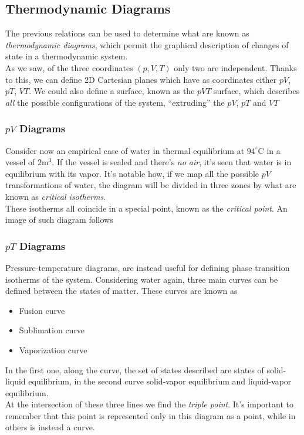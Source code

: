 \documentclass[../qm.tex]{subfiles}
\begin{document}
\subsection{Thermodynamic Diagrams}
The previous relations can be used to determine what are known as \textit{thermodynamic diagrams}, which permit the graphical description of changes of state in a thermodynamic system.\\
As we saw, of the three coordinates $(p, V, T)$ only two are independent. Thanks to this, we can define 2D Cartesian planes which have as coordinates either $pV$, $pT$, $VT$. We could also define a surface, known as the $pVT$ surface, which describes \textit{all} the possible configurations of the system, ``extruding'' the $pV$, $pT$ and $VT$
\subsubsection{$pV$ Diagrams}
Consider now an empirical case of water in thermal equilibrium at $94^\circ\mathrm{C}$ in a vessel of $2\mathrm{m}^3$. If the vessel is sealed and there's \textit{no air}, it's seen that water is in equilibrium with its vapor. It's notable how, if we map all the possible $pV$ transformations of water, the diagram will be divided in three zones by what are known as \textit{critical isotherms}.\\
These isotherms all coincide in a special point, known as the \textit{critical point}. An image of such diagram follows
\subsubsection{$pT$ Diagrams}
Pressure-temperature diagrams, are instead useful for defining phase transition isotherms of the system. Considering water again, three main curves can be defined between the states of matter. These curves are known as
\begin{itemize}
\item Fusion curve
\item Sublimation curve
\item Vaporization curve
\end{itemize}
In the first one, along the curve, the set of states described are states of solid-liquid equilibrium, in the second curve solid-vapor equilibrium and liquid-vapor equilibrium.\\
At the intersection of these three lines we find the \textit{triple point}. It's important to remember that this point is represented only in this diagram as a point, while in others is instead a curve.
\end{document}
